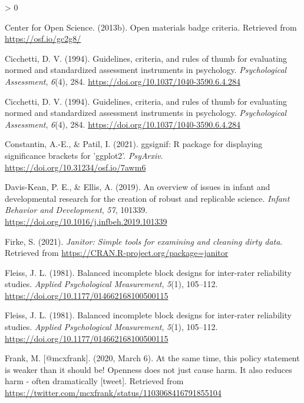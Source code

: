\documentclass[
  english,
  man,floatsintext]{apa6}
\newlength{\cslhangindent}
\newenvironment{CSLReferences}[2] %
 {%
  \setlength{\parindent}{0pt}
  \ifodd #1 \everypar{\setlength{\hangindent}{\cslhangindent}}\ignorespaces\fi
  \ifnum #2 > 0
  \setlength{\parskip}{#2\baselineskip}
  \fi
 }%
 {}
\begin{document}
\begin{CSLReferences}{1}{0}
\leavevmode\hypertarget{ref-center_2013b}{}%
Center for Open Science. (2013b). Open materials badge criteria. Retrieved from \url{https://osf.io/gc2g8/}

\leavevmode\hypertarget{ref-cicchetti1994guidelines}{}%
Cicchetti, D. V. (1994). Guidelines, criteria, and rules of thumb for evaluating normed and standardized assessment instruments in psychology. \emph{Psychological Assessment}, \emph{6}(4), 284. \url{https://doi.org/10.1037/1040-3590.6.4.284}

\leavevmode\hypertarget{ref-cicchetti1994guidelines}{}%
Cicchetti, D. V. (1994). Guidelines, criteria, and rules of thumb for evaluating normed and standardized assessment instruments in psychology. \emph{Psychological Assessment}, \emph{6}(4), 284. \url{https://doi.org/10.1037/1040-3590.6.4.284}

\leavevmode\hypertarget{ref-R-ggsignif}{}%
Constantin, A.-E., \& Patil, I. (2021). {ggsignif}: R package for displaying significance brackets for {'ggplot2'}. \emph{PsyArxiv}. \url{https://doi.org/10.31234/osf.io/7awm6}

\leavevmode\hypertarget{ref-davis2019overview}{}%
Davis-Kean, P. E., \& Ellis, A. (2019). An overview of issues in infant and developmental research for the creation of robust and replicable science. \emph{Infant Behavior and Development}, \emph{57}, 101339. \url{https://doi.org/10.1016/j.infbeh.2019.101339}

\leavevmode\hypertarget{ref-R-janitor}{}%
Firke, S. (2021). \emph{Janitor: Simple tools for examining and cleaning dirty data}. Retrieved from \url{https://CRAN.R-project.org/package=janitor}

\leavevmode\hypertarget{ref-fleiss1981balanced}{}%
Fleiss, J. L. (1981). Balanced incomplete block designs for inter-rater reliability studies. \emph{Applied Psychological Measurement}, \emph{5}(1), 105--112. \url{https://doi.org/10.1177/014662168100500115}

\leavevmode\hypertarget{ref-fleiss1981balanced}{}%
Fleiss, J. L. (1981). Balanced incomplete block designs for inter-rater reliability studies. \emph{Applied Psychological Measurement}, \emph{5}(1), 105--112. \url{https://doi.org/10.1177/014662168100500115}

\leavevmode\hypertarget{ref-Frank_tweet}{}%
Frank, M. {[}@mcxfrank{]}. (2020, March 6). At the same time, this policy statement is weaker than it should be! Openness does not just cause harm. It also reduces harm - often dramatically {[}tweet{]}. Retrieved from \url{https://twitter.com/mcxfrank/status/1103068416791855104}


\end{CSLReferences}
\end{document}

